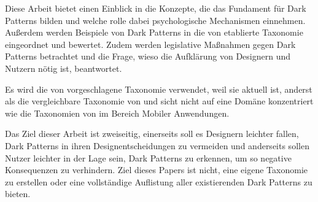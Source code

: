 \documentclass[conference,compsoc,final,a4paper]{IEEEtran}
\begin{document}
Diese Arbeit bietet einen Einblick in die Konzepte, die das Fundament für Dark Patterns bilden und welche rolle dabei psychologische Mechanismen einnehmen. Außerdem werden Beispiele von Dark Patterns in die von \citeauthor{Gray_2018} \autocite{Gray_2018} etablierte Taxonomie eingeordnet und bewertet. Zudem werden legislative Maßnahmen gegen Dark Patterns betrachtet und die Frage, wieso die Aufklärung von Designern und Nutzern nötig ist, beantwortet.

Es wird die von \citeauthor{Gray_2018} \autocite{Gray_2018} vorgeschlagene Taxonomie verwendet, weil sie aktuell ist, anderst als die vergleichbare Taxonomie von \citeauthor{Conti2010} \autocite{Conti2010} und sicht nicht auf eine Domäne konzentriert wie die Taxonomien von \citeauthor{Lewis2014} \autocite{Lewis2014} im Bereich Mobiler Anwendungen.


Das Ziel dieser Arbeit ist zweiseitig, einerseits soll es Designern leichter fallen, Dark Patterns in ihren Designentscheidungen zu vermeiden und anderseits sollen Nutzer leichter in der Lage sein, Dark Patterns zu erkennen, um so negative Konsequenzen zu verhindern. Ziel dieses Papers ist nicht, eine eigene Taxonomie zu erstellen oder eine vollständige Auflistung aller existierenden Dark Patterns zu bieten.


\end{document}
